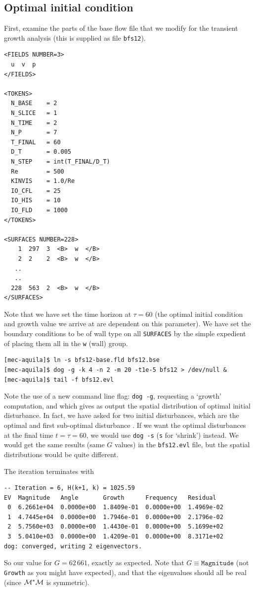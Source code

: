 \documentclass[11pt,a4paper]{report}
\newcommand\Mop{{\cal M}}
\newcommand\Madj{{\cal M^*}}
\begin{document}
\subsection{Optimal initial condition}
\label{sec.bfstg}

First, examine the parts of the base flow file that we modify for the
transient growth analysis (this is supplied as file \verb+bfs12+).
{\small
\begin{verbatim}
<FIELDS NUMBER=3>
  u  v  p
</FIELDS>

<TOKENS>
  N_BASE    = 2
  N_SLICE   = 1
  N_TIME    = 2
  N_P       = 7
  T_FINAL   = 60
  D_T       = 0.005
  N_STEP    = int(T_FINAL/D_T)
  Re        = 500
  KINVIS    = 1.0/Re
  IO_CFL    = 25
  IO_HIS    = 10
  IO_FLD    = 1000
</TOKENS>

<SURFACES NUMBER=228>
    1  297  3  <B>  w  </B>
    2  2    2  <B>  w  </B>
   ..
   ..
  228  563  2  <B>  w  </B>
</SURFACES>
\end{verbatim}
}\noindent Note that we have set the time horizon at $\tau=60$ (the
optimal initial condition and growth value we arrive at are dependent
on this parameter).  We have set the boundary conditions to be of wall
type on all \verb+SURFACES+ by the simple expedient of placing them
all in the \verb+w+ (wall) group.
\begin{verbatim}
[mec-aquila]$ ln -s bfs12-base.fld bfs12.bse
[mec-aquila]$ dog -g -k 4 -n 2 -m 20 -t1e-5 bfs12 > /dev/null &
[mec-aquila]$ tail -f bfs12.evl
\end{verbatim}
\noindent
Note the use of a new command line flag: \verb+dog -g+, requesting a
`growth' computation, and which gives as output the spatial
distribution of optimal initial disturbance.  In fact, we have asked
for two initial disturbances, which are the optimal and first
sub-optimal disturbance \citep[see \S\,4.2.1 and table~5
  of][]{bbs08a}.  If we want the optimal disturbances at the final
time $t=\tau=60$, we would use \verb+dog -s+ (\verb+s+ for `shrink')
instead.  We would get the same results (same $G$ values) in the
\verb+bfs12.evl+ file, but the spatial distributions would be quite
different.

The iteration terminates with
{\small
\begin{verbatim}
-- Iteration = 6, H(k+1, k) = 1025.59
EV  Magnitude   Angle       Growth      Frequency   Residual
 0  6.2661e+04  0.0000e+00  1.8409e-01  0.0000e+00  1.4969e-02
 1  4.7445e+04  0.0000e+00  1.7946e-01  0.0000e+00  2.1796e-02
 2  5.7560e+03  0.0000e+00  1.4430e-01  0.0000e+00  5.1699e+02
 3  5.0410e+03  0.0000e+00  1.4209e-01  0.0000e+00  8.3171e+02
dog: converged, writing 2 eigenvectors.
\end{verbatim}
}\noindent So our value for $G=62\,661$, exactly as expected.  Note
that $G\equiv\texttt{Magnitude}$ (not \verb+Growth+ as you might have
expected), and that the eigenvalues should all be real (since
$\Madj\Mop$ is symmetric).
\end{document}
